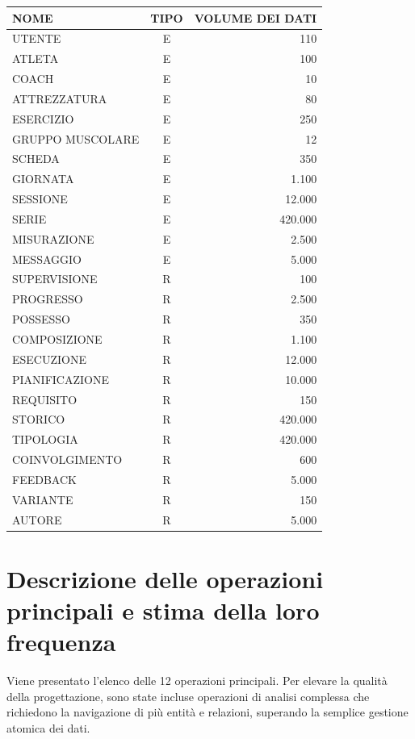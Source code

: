 \documentclass[12pt]{report}
\begin{document}
\begin{longtable}{|l|c|r|}
\hline
\textbf{NOME} & \textbf{TIPO} & \textbf{VOLUME DEI DATI} \\ \hline
\endhead
UTENTE & E & 110 \\ \hline
ATLETA & E & 100 \\ \hline
COACH & E & 10 \\ \hline
ATTREZZATURA & E & 80 \\ \hline
ESERCIZIO & E & 250 \\ \hline
GRUPPO MUSCOLARE & E & 12 \\ \hline
SCHEDA & E & 350 \\ \hline
GIORNATA & E & 1.100 \\ \hline
SESSIONE & E & 12.000 \\ \hline
SERIE & E & 420.000 \\ \hline
MISURAZIONE & E & 2.500 \\ \hline
MESSAGGIO & E & 5.000 \\ \hline
SUPERVISIONE & R & 100 \\ \hline
PROGRESSO & R & 2.500 \\ \hline
POSSESSO & R & 350 \\ \hline
COMPOSIZIONE & R & 1.100 \\ \hline
ESECUZIONE & R & 12.000 \\ \hline
PIANIFICAZIONE & R & 10.000 \\ \hline
REQUISITO & R & 150 \\ \hline
STORICO & R & 420.000 \\ \hline
TIPOLOGIA & R & 420.000 \\ \hline
COINVOLGIMENTO & R & 600 \\ \hline
FEEDBACK & R & 5.000 \\ \hline
VARIANTE & R & 150 \\ \hline
AUTORE & R & 5.000 \\ \hline
\end{longtable}

\section{Descrizione delle operazioni principali e stima della loro frequenza}
Viene presentato l'elenco delle 12 operazioni principali. Per elevare la qualità della progettazione, sono state incluse operazioni di analisi complessa che richiedono la navigazione di più entità e relazioni, superando la semplice gestione atomica dei dati.
\end{document}
